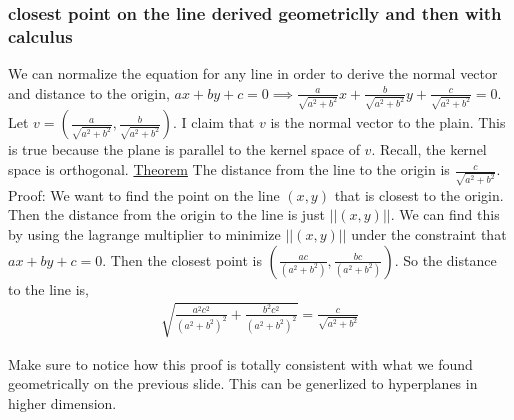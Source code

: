 \documentclass{beamer}
\theoremstyle{definition}
\renewcommand{\=}{&=&}
\newcommand{\<}{\langle}
\renewcommand{\>}{\rangle}
\begin{document}
\begin{frame}[t]
\frametitle{closest point on the line derived geometriclly and then with calculus}
We can normalize the equation for any line in order to derive the normal vector
and distance to the origin,
$ax + by + c = 0 \implies \frac{a}{\sqrt{a^2 + b^2}}x + \frac{b}{\sqrt{a^2 +
    b^2}}y + \frac{c}{\sqrt{a^2 + b^2}} = 0$.
Let $v = (\frac{a}{\sqrt{a^2 + b^2}},
\frac{b}{\sqrt{a^2 + b^2}})$. I claim that $v$ is the normal vector to the
plain. This is true because the plane is parallel to the kernel space of $v$.
Recall, the kernel space is orthogonal.
\underline{Theorem} The distance from the line to the origin is
$\frac{c}{\sqrt{a^2 + b^2}}$. \\
Proof: We want to find the point on the line $(x, y)$ that is closest to the
origin. Then the distance from the origin to the line is just $||(x, y)||$. We
can find this by using the lagrange multiplier to minimize $||(x, y)||$ under
the constraint that $ax + by + c = 0$. Then the closest point is $(\frac{ac}{(a^2 +
    b^2)}, \frac{bc}{(a^2 + b^2)})$. So the distance to the line is,
\begin{align*}
  \sqrt{\frac{a^2c^2}{(a^2 +
    b^2)^2} + \frac{b^2c^2}{(a^2 + b^2)^2}} = \frac{c}{\sqrt{a^2 + b^2}}
\end{align*}
\end{frame}
\begin{frame}[t]
Make sure to notice how this proof is totally consistent with what we found geometrically on
the previous slide.
This can be generlized to hyperplanes in higher dimension.
\end{frame}
\end{document}
